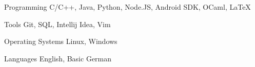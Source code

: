 

\begin{cvskills}

  \cvskill
    {Programming} %
    {C/C++, Java, Python, Node.JS, Android SDK, OCaml, LaTeX} %

  \cvskill
    {Tools} %
    {Git, SQL, Intellij Idea, Vim} %

  \cvskill
    {Operating Systems} %
    {Linux, Windows} %

  \cvskill
    {Languages} %
    {English, Basic German} %

\end{cvskills}
